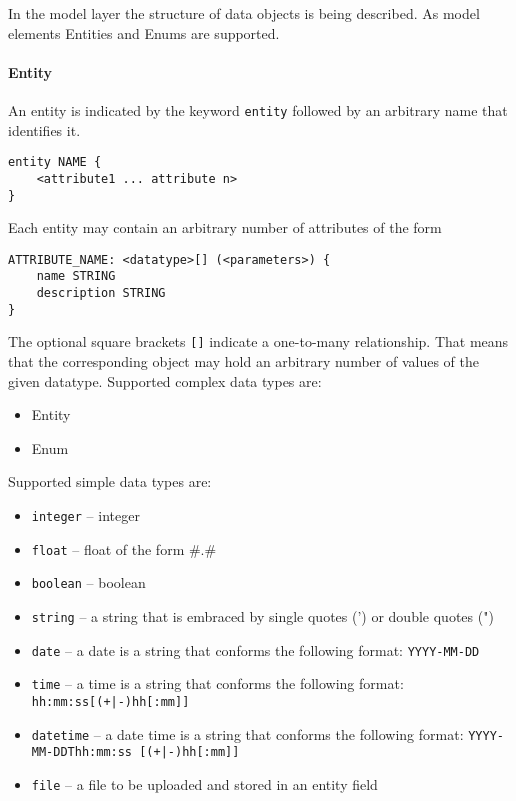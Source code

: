 
In the model layer the structure of data objects is being described. As model elements Entities and Enums are supported.
\paragraph{Entity}
An entity is indicated by the keyword {\lstinline!entity!} followed by an arbitrary name that identifies it.
\begin{lstlisting}
entity NAME {
	<attribute1 ... attribute n>
}
\end{lstlisting}
Each entity may contain an arbitrary number of attributes of the form
\begin{lstlisting}
ATTRIBUTE_NAME: <datatype>[] (<parameters>) {
	name STRING
	description STRING
}
\end{lstlisting}
The optional square brackets \lstinline|[]| indicate a one-to-many relationship. That means that the corresponding object may hold an arbitrary number of values of the given datatype.
Supported complex data types are:
\begin{itemize}
\item{Entity}
\item{Enum}
\end{itemize}
Supported simple data types are:

\begin{itemize}
\item{\lstinline!integer! -- integer}
\item{\lstinline!float! -- float of the form \#.\#}
\item{\lstinline!boolean! -- boolean}
\item{\lstinline!string! -- a string that is embraced by single quotes (') or double quotes (")}
\item{\lstinline!date! -- a date is a string that conforms the following format: \lstinline!YYYY-MM-DD!}
\item{\lstinline!time! -- a time is a string that conforms the following format: \lstinline!hh:mm:ss[(+|-)hh[:mm]]!}
\item{\lstinline!datetime! -- a date time is a string that conforms the following format: \lstinline!YYYY-MM-DDThh:mm:ss [(+|-)hh[:mm]]!}
\item{\lstinline!file! -- a file to be uploaded and stored in an entity field}
\end{itemize}

